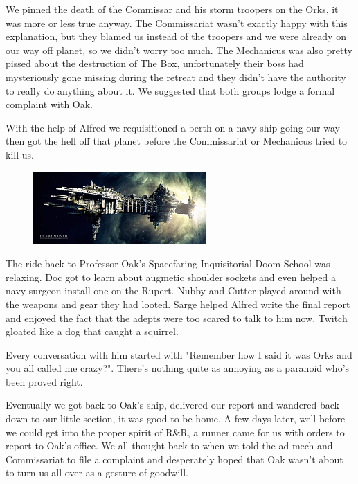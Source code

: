 We pinned the death of the Commissar and his storm troopers on the Orks, it was more or less true anyway. 
The Commissariat wasn't exactly happy with this explanation, but they blamed us instead of the troopers and we were already on our way off planet, so we didn’t worry too much. 
The Mechanicus was also pretty pissed about the destruction of The Box, unfortunately their boss had mysteriously gone missing during the retreat and they didn't have the authority to really do anything about it. 
We suggested that both groups lodge a formal complaint with Oak.

With the help of Alfred we requisitioned a berth on a navy ship going our way then got the hell off that planet before the Commissariat or Mechanicus tried to kill us.

\begin{figure}
	\begin{center}
		\includegraphics[width=\figwidth]{pics/4/34.png}
	\end{center}
\end{figure}
The ride back to Professor Oak's Spacefaring Inquisitorial Doom School was relaxing. 
Doc got to learn about augmetic shoulder sockets and even helped a navy surgeon install one on the Rupert. 
Nubby and Cutter played around with the weapons and gear they had looted. 
Sarge helped Alfred write the final report and enjoyed the fact that the adepts were too scared to talk to him now. 
Twitch gloated like a dog that caught a squirrel.

Every conversation with him started with "Remember how I said it was Orks and you all called me crazy?".
There's nothing quite as annoying as a paranoid who's been proved right.

Eventually we got back to Oak's ship, delivered our report and wandered back down to our little section, it was good to be home. 
A few days later, well before we could get into the proper spirit of R\&R, a runner came for us with orders to report to Oak's office. 
We all thought back to when we told the ad-mech and Commissariat to file a complaint and desperately hoped that Oak wasn't about to turn us all over as a gesture of goodwill.

